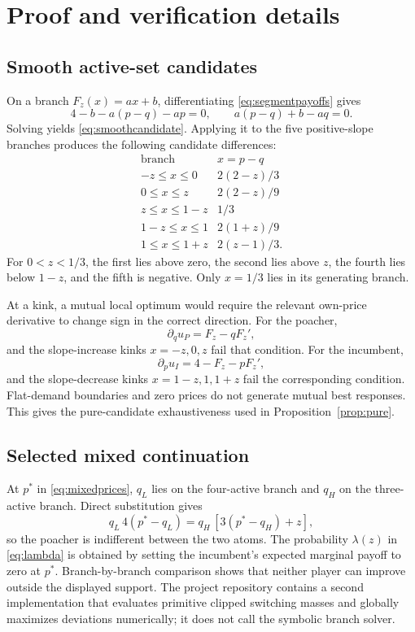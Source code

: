 \appendix
\section{Proof and verification details}\label{app:proofs}

\subsection{Smooth active-set candidates}

On a branch \(F_z(x)=ax+b\), differentiating \eqref{eq:segmentpayoffs} gives
\[
4-b-a(p-q)-ap=0,
\qquad
a(p-q)+b-aq=0.
\]
Solving yields \eqref{eq:smoothcandidate}.  Applying it to the five positive-slope branches produces the following candidate differences:
\[
\begin{array}{c|c}
\text{branch} & x=p-q\\ \hline
-z\le x\le0 & 2(2-z)/3\\
0\le x\le z & 2(2-z)/9\\
z\le x\le1-z & 1/3\\
1-z\le x\le1 & 2(1+z)/9\\
1\le x\le1+z & 2(z-1)/3.
\end{array}
\]
For \(0<z<1/3\), the first lies above zero, the second lies above \(z\), the fourth lies below \(1-z\), and the fifth is negative.  Only \(x=1/3\) lies in its generating branch.

At a kink, a mutual local optimum would require the relevant own-price derivative to change sign in the correct direction.  For the poacher,
\[
\partial_q u_P=F_z-qF_z',
\]
and the slope-increase kinks \(x=-z,0,z\) fail that condition.  For the incumbent,
\[
\partial_p u_I=4-F_z-pF_z',
\]
and the slope-decrease kinks \(x=1-z,1,1+z\) fail the corresponding condition.  Flat-demand boundaries and zero prices do not generate mutual best responses.  This gives the pure-candidate exhaustiveness used in Proposition~\ref{prop:pure}.

\subsection{Selected mixed continuation}

At \(p^*\) in \eqref{eq:mixedprices}, \(q_L\) lies on the four-active branch and \(q_H\) on the three-active branch.  Direct substitution gives
\[
q_L\,4(p^*-q_L)
=
q_H\,[3(p^*-q_H)+z],
\]
so the poacher is indifferent between the two atoms.  The probability \(\lambda(z)\) in \eqref{eq:lambda} is obtained by setting the incumbent's expected marginal payoff to zero at \(p^*\).  Branch-by-branch comparison shows that neither player can improve outside the displayed support.  The project repository contains a second implementation that evaluates primitive clipped switching masses and globally maximizes deviations numerically; it does not call the symbolic branch solver.

